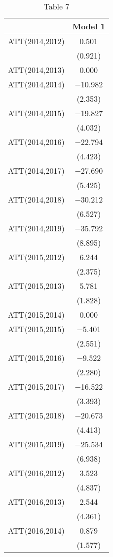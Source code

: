 \begin{table}

\caption{Table 7}
\centering
\begin{tabular}[t]{lc}
\toprule
  & Model 1\\
\midrule
ATT(2014,2012) & \num{0.501}\\
 & (\num{0.921})\\
ATT(2014,2013) & \num{0.000}\\
ATT(2014,2014) & \num{-10.982}\\
 & (\num{2.353})\\
ATT(2014,2015) & \num{-19.827}\\
 & (\num{4.032})\\
ATT(2014,2016) & \num{-22.794}\\
 & (\num{4.423})\\
ATT(2014,2017) & \num{-27.690}\\
 & (\num{5.425})\\
ATT(2014,2018) & \num{-30.212}\\
 & (\num{6.527})\\
ATT(2014,2019) & \num{-35.792}\\
 & (\num{8.895})\\
ATT(2015,2012) & \num{6.244}\\
 & (\num{2.375})\\
ATT(2015,2013) & \num{5.781}\\
 & (\num{1.828})\\
ATT(2015,2014) & \num{0.000}\\
ATT(2015,2015) & \num{-5.401}\\
 & (\num{2.551})\\
ATT(2015,2016) & \num{-9.522}\\
 & (\num{2.280})\\
ATT(2015,2017) & \num{-16.522}\\
 & (\num{3.393})\\
ATT(2015,2018) & \num{-20.673}\\
 & (\num{4.413})\\
ATT(2015,2019) & \num{-25.534}\\
 & (\num{6.938})\\
ATT(2016,2012) & \num{3.523}\\
 & (\num{4.837})\\
ATT(2016,2013) & \num{2.544}\\
 & (\num{4.361})\\
ATT(2016,2014) & \num{0.879}\\
 & (\num{1.577})\\

\end{tabular}
\end{table}
